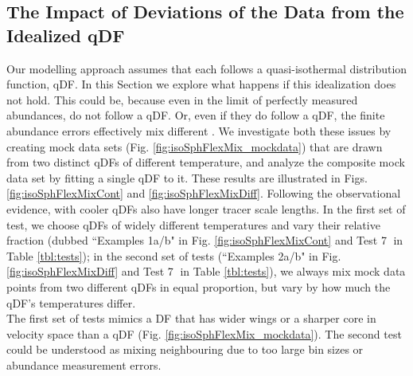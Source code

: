 \subsection{The Impact of Deviations of the Data from the Idealized qDF} \label{sec:results_mixedDFs}

Our modelling approach assumes that each \MAP follows a quasi-isothermal distribution function, qDF. In this Section we explore what happens if this idealization does not hold. This could be, because even in the limit of perfectly measured abundances, \MAPs do not follow a qDF. Or, even if they do follow a qDF, the finite abundance errors effectively mix different \MAPs. We investigate both these issues by creating mock data sets (Fig. \ref{fig:isoSphFlexMix_mockdata}) that are drawn from two distinct qDFs of different temperature, and analyze the composite mock data set by fitting a single qDF to it. These results are illustrated in Figs. \ref{fig:isoSphFlexMixCont} and \ref{fig:isoSphFlexMixDiff}. Following the observational evidence, \MAPs with cooler qDFs also have longer tracer scale lengths. In the first set of test, we choose qDFs of widely different temperatures and vary their relative fraction (dubbed ``Examples 1a/b" in Fig. \ref{fig:isoSphFlexMixCont} and Test \textcircled{7} in Table \ref{tbl:tests}); in the second set of tests (``Examples 2a/b" in Fig. \ref{fig:isoSphFlexMixDiff} and Test \textcircled{7} in Table \ref{tbl:tests}), we always mix mock data points from two different qDFs in equal proportion, but vary by how much the qDF's temperatures differ. 
\\The first set of tests mimics a DF that has wider wings or a sharper core in velocity space than a qDF (Fig. \ref{fig:isoSphFlexMix_mockdata}). The second test could be understood as mixing neighbouring \MAPs due to too large bin sizes or abundance measurement errors.

